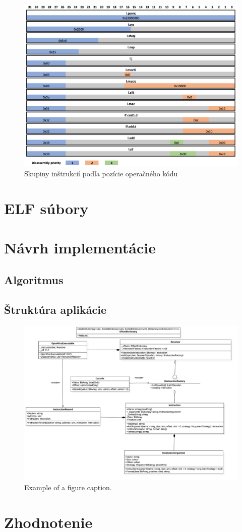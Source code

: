 \documentclass[conference]{IEEEtran}
\begin{document}
\begin{figure}[H]
\centerline{\includegraphics[width=\columnwidth]{diagrams/InstructionGroups}}
\caption{Skupiny inštrukcií podľa pozície operačného kódu}
\label{fig}
\end{figure}

\section{ELF súbory}

\section{Návrh implementácie}

\subsection{Algoritmus}

\subsection{Štruktúra aplikácie}

\begin{figure}[H]
\centerline{\includegraphics[width=\columnwidth]{diagrams/ClassDiagram}}
\caption{Example of a figure caption.}
\label{fig}
\end{figure}

\section{Zhodnotenie}




\end{document}
